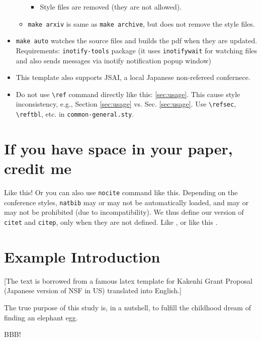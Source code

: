 \begin{itemize}
\begin{itemize}
\begin{itemize}
    \item
      Style files are removed (they are not allowed).
    \end{itemize}
  \item
    \texttt{make\ arxiv} is same as \texttt{make\ archive}, but does not
    remove the style files.
  \end{itemize}
\item
  \texttt{make\ auto} watches the source files and builds the pdf when
  they are updated. Requirements: \texttt{inotify-tools} package (it
  uses \texttt{inotifywait} for watching files and also sends messages
  via inotify notification popup window)
\item
  This template also supports JSAI, a local Japanese non-refereed
  confernece.
 \item Do not use \texttt{\textbackslash{}ref} command directly like this: \ref{sec:usage}.
       This cause style inconsistency, e.g., Section \ref{sec:usage} vs. Sec. \ref{sec:usage}.
       Use \texttt{\textbackslash{}refsec}, \texttt{\textbackslash{}reftbl}, etc.
       in \texttt{common-general.sty}.
\end{itemize}



\section{If you have space in your paper, credit me}

Like this! \cite{aaai-template}
Or you can also use \texttt{nocite} command like this. \nocite{aaai-template}
Depending on the conference styles,
\texttt{natbib} may or may not be automatically loaded,
and may or may not be prohibited (due to incompatibility).
We thus define our version of \texttt{citet} and \texttt{citep},
only when they are not defined.
Like \citet{aaai-template}, or like this \citep{aaai-template}.



\section{Example Introduction}

[The text is borrowed from a famous latex template for Kakenhi Grant
Proposal (Japanese version of NSF in US) translated into English.]

The true purpose of this study is, in a nutshell, to fulfill the childhood dream of finding an elephant egg.

BBB!  \cite{Asai2016}

